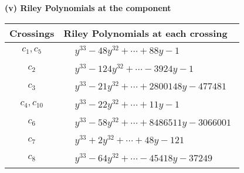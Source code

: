 \documentclass[1p]{elsarticle_modified}
\theoremstyle{definition}
\begin{document}
\newpage\renewcommand{\arraystretch}{1}
\flushleft \textbf{(v) Riley Polynomials at the component}\newline \\
\begin{tabular}{m{50pt}|m{274pt}}
Crossings & \hspace{64pt}Riley Polynomials at each crossing \\
\hline $$\begin{aligned}c_{1},c_{5}\end{aligned}$$&$\begin{aligned}
&y^{33}-48 y^{32}+\cdots+88 y-1
\end{aligned}$\\
\hline $$\begin{aligned}c_{2}\end{aligned}$$&$\begin{aligned}
&y^{33}-124 y^{32}+\cdots-3924 y-1
\end{aligned}$\\
\hline $$\begin{aligned}c_{3}\end{aligned}$$&$\begin{aligned}
&y^{33}-21 y^{32}+\cdots+2800148 y-477481
\end{aligned}$\\
\hline $$\begin{aligned}c_{4},c_{10}\end{aligned}$$&$\begin{aligned}
&y^{33}-22 y^{32}+\cdots+11 y-1
\end{aligned}$\\
\hline $$\begin{aligned}c_{6}\end{aligned}$$&$\begin{aligned}
&y^{33}-58 y^{32}+\cdots+8486511 y-3066001
\end{aligned}$\\
\hline $$\begin{aligned}c_{7}\end{aligned}$$&$\begin{aligned}
&y^{33}+2 y^{32}+\cdots+48 y-121
\end{aligned}$\\
\hline $$\begin{aligned}c_{8}\end{aligned}$$&$\begin{aligned}
&y^{33}-64 y^{32}+\cdots-45418 y-37249
\end{aligned}$\\

\end{tabular}
\end{document}
